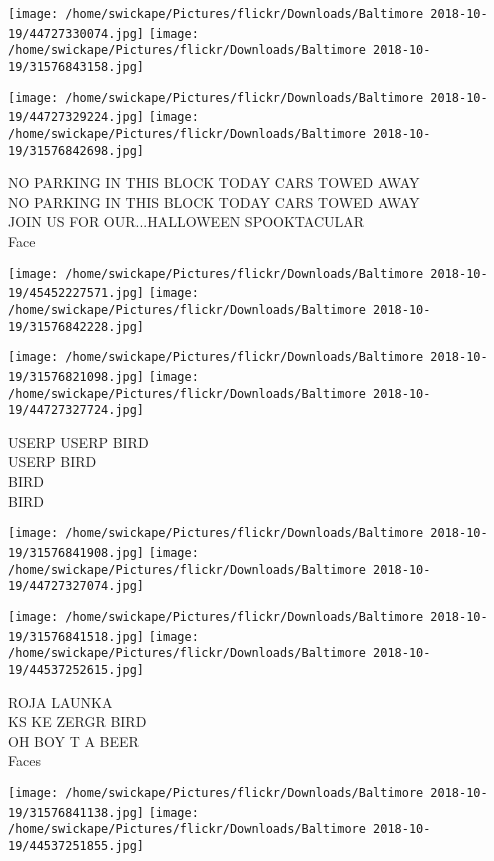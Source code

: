 \documentclass[10pt,letterpaper]{article}
\begin{document}
\texttt{[image: /home/swickape/Pictures/flickr/Downloads/Baltimore 2018-10-19/44727330074.jpg]}
\texttt{[image: /home/swickape/Pictures/flickr/Downloads/Baltimore 2018-10-19/31576843158.jpg]}

\texttt{[image: /home/swickape/Pictures/flickr/Downloads/Baltimore 2018-10-19/44727329224.jpg]}
\texttt{[image: /home/swickape/Pictures/flickr/Downloads/Baltimore 2018-10-19/31576842698.jpg]}

NO PARKING IN THIS BLOCK TODAY CARS TOWED AWAY\\
NO PARKING IN THIS BLOCK TODAY CARS TOWED AWAY\\
JOIN US FOR OUR...HALLOWEEN SPOOKTACULAR\\
Face\\
\pagebreak

\texttt{[image: /home/swickape/Pictures/flickr/Downloads/Baltimore 2018-10-19/45452227571.jpg]}
\texttt{[image: /home/swickape/Pictures/flickr/Downloads/Baltimore 2018-10-19/31576842228.jpg]}

\texttt{[image: /home/swickape/Pictures/flickr/Downloads/Baltimore 2018-10-19/31576821098.jpg]}
\texttt{[image: /home/swickape/Pictures/flickr/Downloads/Baltimore 2018-10-19/44727327724.jpg]}

USERP USERP BIRD\\
USERP BIRD\\
BIRD\\
BIRD\\
\pagebreak

\texttt{[image: /home/swickape/Pictures/flickr/Downloads/Baltimore 2018-10-19/31576841908.jpg]}
\texttt{[image: /home/swickape/Pictures/flickr/Downloads/Baltimore 2018-10-19/44727327074.jpg]}

\texttt{[image: /home/swickape/Pictures/flickr/Downloads/Baltimore 2018-10-19/31576841518.jpg]}
\texttt{[image: /home/swickape/Pictures/flickr/Downloads/Baltimore 2018-10-19/44537252615.jpg]}

ROJA LAUNKA\\
KS KE ZERGR BIRD\\
OH BOY T A BEER\\
Faces\\
\pagebreak

\texttt{[image: /home/swickape/Pictures/flickr/Downloads/Baltimore 2018-10-19/31576841138.jpg]}
\texttt{[image: /home/swickape/Pictures/flickr/Downloads/Baltimore 2018-10-19/44537251855.jpg]}
\end{document}
